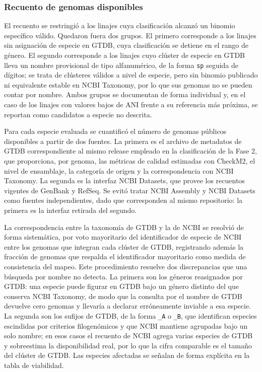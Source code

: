 \subsubsection{Recuento de genomas disponibles}

El recuento se restringió a los linajes cuya clasificación alcanzó un binomio específico válido. Quedaron fuera dos grupos. El primero corresponde a los linajes sin asignación de especie en GTDB, cuya clasificación se detiene en el rango de género. El segundo corresponde a los linajes cuyo clúster de especie en GTDB lleva un nombre provisional de tipo alfanumérico, de la forma \texttt{sp} seguida de dígitos; se trata de clústeres válidos a nivel de especie, pero sin binomio publicado ni equivalente estable en NCBI Taxonomy, por lo que sus genomas no se pueden contar por nombre. Ambos grupos se documentan de forma individual y, en el caso de los linajes con valores bajos de ANI frente a su referencia más próxima, se reportan como candidatos a especie no descrita.

Para cada especie evaluada se cuantificó el número de genomas públicos disponibles a partir de dos fuentes. La primera es el archivo de metadatos de GTDB correspondiente al mismo release empleado en la clasificación de la Fase 2, que proporciona, por genoma, las métricas de calidad estimadas con CheckM2, el nivel de ensamblaje, la categoría de origen y la correspondencia con NCBI Taxonomy. La segunda es la interfaz NCBI Datasets, que provee los recuentos vigentes de GenBank y RefSeq. Se evitó tratar NCBI Assembly y NCBI Datasets como fuentes independientes, dado que corresponden al mismo repositorio: la primera es la interfaz retirada del segundo.

La correspondencia entre la taxonomía de GTDB y la de NCBI se resolvió de forma sistemática, por voto mayoritario del identificador de especie de NCBI entre los genomas que integran cada clúster de GTDB, registrando además la fracción de genomas que respalda el identificador mayoritario como medida de consistencia del mapeo. Este procedimiento resuelve dos discrepancias que una búsqueda por nombre no detecta. La primera son los géneros reasignados por GTDB: una especie puede figurar en GTDB bajo un género distinto del que conserva NCBI Taxonomy, de modo que la consulta por el nombre de GTDB devuelve cero genomas y llevaría a declarar erróneamente inviable a esa especie. La segunda son los sufijos de GTDB, de la forma \texttt{\_A} o \texttt{\_B}, que identifican especies escindidas por criterios filogenómicos y que NCBI mantiene agrupadas bajo un solo nombre; en esos casos el recuento de NCBI agrega varias especies de GTDB y sobreestima la disponibilidad real, por lo que la cifra comparable es el tamaño del clúster de GTDB. Las especies afectadas se señalan de forma explícita en la tabla de viabilidad.

